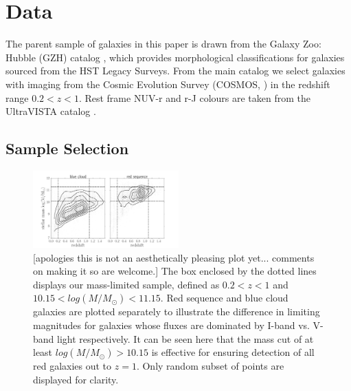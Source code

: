 \documentclass[useAMS,usenatbib]{mn2e}
\begin{document}
\section{Data}
\label{sec:Data}

The parent sample of galaxies in this paper is drawn from the Galaxy Zoo: Hubble (GZH) catalog \citep{Willett2016}, which provides morphological classifications for galaxies sourced from the HST Legacy Surveys. From the main catalog we select galaxies with imaging from the Cosmic Evolution Survey (COSMOS, \citet{Scoville2007}) in the redshift range $0.2<z<1$.  Rest frame NUV-r and r-J colours are taken from the UltraVISTA catalog \citep{McCracken2012,Ilbert2013}.

\subsection{Sample Selection}
\label{sec:sampleselection}

\begin{figure}
\centering
\includegraphics[width=0.5\textwidth]{figures/mass_selection.pdf}
\caption{[apologies this is not an aesthetically pleasing plot yet... comments on making it so are welcome.] The box enclosed by the dotted lines displays our mass-limited sample, defined as $0.2<z<1$ and $10.15<log(M/M_{\odot})<11.15$. Red sequence and blue cloud galaxies are plotted separately to illustrate the difference in limiting magnitudes for galaxies whose fluxes are dominated by I-band vs. V-band light respectively. It can be seen here that the mass cut of at least $log(M/M_{\odot})>10.15$ is effective for ensuring detection of all red galaxies out to $z=1$. Only random subset of points are displayed for clarity.}
\label{masscut}
\end{figure}
\end{document}

